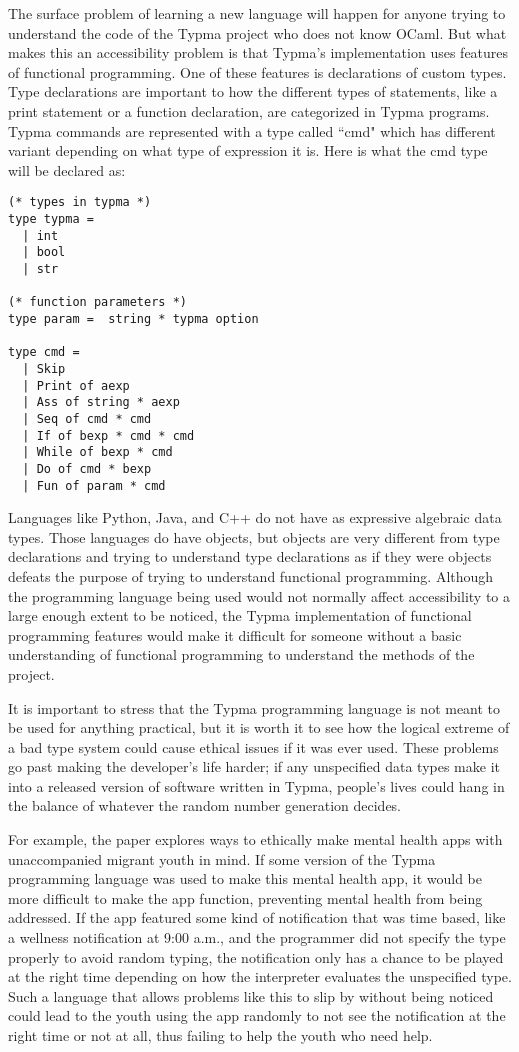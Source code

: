 \documentclass[10pt,twocolumn]{article}
\begin{document}
The surface problem of learning a new language will happen for anyone trying to understand the code of the Typma project who does not know OCaml. But what makes this an accessibility problem is that Typma's implementation uses features of functional programming. One of these features is declarations of custom types. Type declarations are important to how the different types of statements, like a print statement or a function declaration, are categorized in Typma programs. Typma commands are represented with a type called ``cmd" which has different variant depending on what type of expression it is. Here is what the cmd type will be declared as:

\begin{lstlisting}
(* types in typma *)
type typma =
  | int
  | bool
  | str

(* function parameters *)
type param =  string * typma option

type cmd =
  | Skip
  | Print of aexp
  | Ass of string * aexp
  | Seq of cmd * cmd
  | If of bexp * cmd * cmd
  | While of bexp * cmd
  | Do of cmd * bexp
  | Fun of param * cmd
  \end{lstlisting}


Languages like Python, Java, and C++ do not have as expressive algebraic data types. Those languages do have objects, but objects are very different from type declarations and trying to understand type declarations as if they were objects defeats the purpose of trying to understand functional programming. Although the programming language being used would not normally affect accessibility to a large enough extent to be noticed, the Typma implementation of functional programming features would make it difficult for someone without a basic understanding of functional programming to understand the methods of the project.

It is important to stress that the Typma programming language is not meant to be used for anything practical, but it is worth it to see how the logical extreme of a bad type system could cause ethical issues if it was ever used. These problems go past making the developer's life harder; if any unspecified data types make it into a released version of software written in Typma, people's lives could hang in the balance of whatever the random number generation decides.

For example, the paper \textcite{Tachtler2021Unaccompanied} explores ways to ethically make mental health apps with unaccompanied migrant youth in mind. If some version of the Typma programming language was used to make this mental health app, it would be more difficult to make the app function, preventing mental health from being addressed. If the app featured some kind of notification that was time based, like a wellness notification at 9:00 a.m., and the programmer did not specify the type properly to avoid random typing, the notification only has a chance to be played at the right time depending on how the interpreter evaluates the unspecified type. Such a language that allows problems like this to slip by without being noticed could lead to the youth using the app randomly to not see the notification at the right time or not at all, thus failing to help the youth who need help. 
\end{document}
